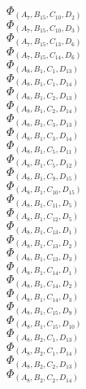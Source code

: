 \documentclass[14pt]{article}
\begin{document}
    $\Phi_{({A}_{7}, {B}_{15}, {C}_{10}, {D}_{2})}$ \\ 
    $\Phi_{({A}_{7}, {B}_{15}, {C}_{10}, {D}_{3})}$ \\ 
    $\Phi_{({A}_{7}, {B}_{15}, {C}_{13}, {D}_{6})}$ \\ 
    $\Phi_{({A}_{7}, {B}_{15}, {C}_{14}, {D}_{6})}$ \\ 
    $\Phi_{({A}_{8}, {B}_{1}, {C}_{1}, {D}_{13})}$ \\ 
    $\Phi_{({A}_{8}, {B}_{1}, {C}_{1}, {D}_{14})}$ \\ 
    $\Phi_{({A}_{8}, {B}_{1}, {C}_{2}, {D}_{13})}$ \\ 
    $\Phi_{({A}_{8}, {B}_{1}, {C}_{2}, {D}_{14})}$ \\ 
    $\Phi_{({A}_{8}, {B}_{1}, {C}_{3}, {D}_{13})}$ \\ 
    $\Phi_{({A}_{8}, {B}_{1}, {C}_{3}, {D}_{14})}$ \\ 
    $\Phi_{({A}_{8}, {B}_{1}, {C}_{5}, {D}_{11})}$ \\ 
    $\Phi_{({A}_{8}, {B}_{1}, {C}_{5}, {D}_{12})}$ \\ 
    $\Phi_{({A}_{8}, {B}_{1}, {C}_{9}, {D}_{15})}$ \\ 
    $\Phi_{({A}_{8}, {B}_{1}, {C}_{10}, {D}_{15})}$ \\ 
    $\Phi_{({A}_{8}, {B}_{1}, {C}_{11}, {D}_{5})}$ \\ 
    $\Phi_{({A}_{8}, {B}_{1}, {C}_{12}, {D}_{5})}$ \\ 
    $\Phi_{({A}_{8}, {B}_{1}, {C}_{13}, {D}_{1})}$ \\ 
    $\Phi_{({A}_{8}, {B}_{1}, {C}_{13}, {D}_{2})}$ \\ 
    $\Phi_{({A}_{8}, {B}_{1}, {C}_{13}, {D}_{3})}$ \\ 
    $\Phi_{({A}_{8}, {B}_{1}, {C}_{14}, {D}_{1})}$ \\ 
    $\Phi_{({A}_{8}, {B}_{1}, {C}_{14}, {D}_{2})}$ \\ 
    $\Phi_{({A}_{8}, {B}_{1}, {C}_{14}, {D}_{3})}$ \\ 
    $\Phi_{({A}_{8}, {B}_{1}, {C}_{15}, {D}_{9})}$ \\ 
    $\Phi_{({A}_{8}, {B}_{1}, {C}_{15}, {D}_{10})}$ \\ 
    $\Phi_{({A}_{8}, {B}_{2}, {C}_{1}, {D}_{13})}$ \\ 
    $\Phi_{({A}_{8}, {B}_{2}, {C}_{1}, {D}_{14})}$ \\ 
    $\Phi_{({A}_{8}, {B}_{2}, {C}_{2}, {D}_{13})}$ \\ 
    $\Phi_{({A}_{8}, {B}_{2}, {C}_{2}, {D}_{14})}$ \\ 
\end{document}
